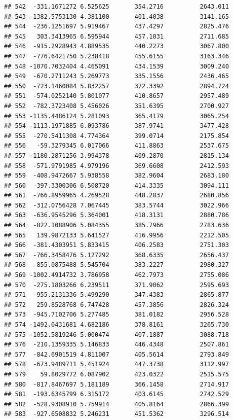 \documentclass[
]{article}
\begin{document}
\begin{verbatim}
## 542  -331.1671272 6.525625       354.2716          2643.011
## 543 -1382.5753130 4.381100       401.4038          3141.165
## 544  -236.1251697 5.919467       437.4297          2825.476
## 545   303.3413965 6.595944       457.1031          2711.685
## 546  -915.2928943 4.889535       440.2273          3067.800
## 547  -776.6421750 5.238418       455.6155          3163.346
## 548 -1070.7032404 4.465091       434.1539          3009.240
## 549  -670.2711243 5.269773       335.1556          2436.465
## 550  -723.1460084 5.832257       372.3392          2894.724
## 551  -574.0252140 5.801077       410.8657          2957.489
## 552  -782.3723408 5.456026       351.6395          2700.927
## 553 -1135.4486124 5.281093       365.4179          3065.254
## 554 -1113.1971885 6.093786       387.9741          3477.428
## 555  -270.5411308 4.774364       399.0714          2175.854
## 556   -59.3279345 6.017066       411.8863          2537.675
## 557 -1180.2871256 3.994378       409.2870          2815.134
## 558  -571.9791985 4.979196       369.6608          2412.593
## 559  -408.9472667 5.938558       382.9604          2683.180
## 560  -397.3300306 6.508720       414.3335          3094.111
## 561  -766.8959965 4.269528       448.2837          2680.856
## 562  -312.0756428 7.067445       383.5744          3022.966
## 563  -636.9545296 5.364001       418.3131          2880.786
## 564  -822.1088906 5.084355       385.7966          2783.636
## 565   139.9872133 5.641527       416.9956          2212.505
## 566  -381.4303951 5.833415       406.2583          2751.303
## 567  -766.3458476 5.127292       368.6335          2656.437
## 568  -855.0875488 5.545704       383.2227          2980.327
## 569 -1002.4914732 3.786958       462.7973          2755.086
## 570  -275.1803266 6.239511       371.9062          2595.693
## 571  -955.2131336 5.499290       347.4383          2865.877
## 572   259.8528768 6.747428       457.3856          2826.324
## 573  -945.7102706 5.277485       381.0182          2956.528
## 574 -1492.0431681 4.682186       378.8161          3265.730
## 575 -1052.5819246 5.000474       407.1887          3088.718
## 576  -210.1359335 5.146833       446.4348          2507.861
## 577  -842.6901519 4.811007       405.5614          2793.849
## 578  -673.9489711 5.451924       447.3738          3112.997
## 579    59.8029772 6.087902       423.0322          2515.575
## 580  -817.8467697 5.181189       366.1458          2714.917
## 581  -193.6345799 6.315172       403.6145          2742.529
## 582  -528.9308910 5.759914       405.8164          2866.399
## 583  -927.6508832 5.246231       451.5362          3296.514

\end{verbatim}
\end{document}
